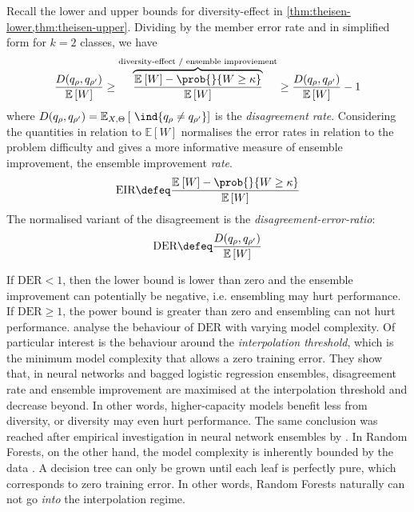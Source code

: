 \documentclass[
	twoside=false, %
]{kaobook}
\begin{document}
Recall the lower and upper bounds for diversity-effect in \cref{thm:theisen-lower,thm:theisen-upper}. 
Dividing by the member error rate and in simplified form for $k=2$ classes, we have
$$
\frac{
D(q_{\rho}, q_{\rho'}) 
}{\mathbb{E}\left[W\right]}
\geq 
\overbrace{
\frac{
\mathbb{E}_{}\left[ W \right]  - \prob{}{W \geq \kappa} 
}{\mathbb{E}\left[W\right]}
}^{\text{diversity-effect / ensemble improviement} }
\geq 
\frac{
D(q_{\rho}, q_{\rho'}) 
}{\mathbb{E}\left[W\right]}
-1
$$ 
where $D(q_{\rho}, q_{\rho'}) = \mathbb{E}_{X, \Theta}\left[ ~\ind{q_{\rho} \not= q_{\rho'}} \right]$ is the \textit{disagreement rate}.
Considering the quantities in relation to $\mathbb{E}\left[W\right]$ normalises the error rates in relation to the problem difficulty and gives a more informative measure of ensemble improvement, the ensemble improvement \textit{rate}.
$$
\text{EIR} \defeq \frac{
\mathbb{E}_{}\left[ W \right]  - \prob{}{W \geq \kappa} 
}{\mathbb{E}\left[W\right]}
$$
The normalised variant of the disagreement is the \textit{disagreement-error-ratio}:
$$
\text{DER} \defeq 
\frac{
D(q_{\rho}, q_{\rho'}) 
}{\mathbb{E}\left[W\right]}
$$

If $\text{DER} < 1$, then the lower bound is lower than zero and the ensemble improvement can potentially be negative, i.e. ensembling may hurt performance. If $\text{DER} \geq 1$, the power bound is greater than zero and ensembling can not hurt performance. \citeauthor{theisen_WhenAreEnsembles_2023} \cite{theisen_WhenAreEnsembles_2023} analyse the behaviour of $\text{DER}$ with varying model complexity. Of particular interest is the behaviour around the \textit{interpolation threshold}, which is the minimum model complexity that allows a zero training error. They show that, in neural networks and bagged logistic regression ensembles, disagreement rate and ensemble improvement are maximised at the interpolation threshold and decrease beyond. In other words, higher-capacity models benefit less from diversity, or diversity may even hurt performance. The same conclusion was reached after empirical investigation in neural network ensembles by \citeauthor{abe_BestDeepEnsembles_2022} \cite{abe_BestDeepEnsembles_2022}.
In Random Forests, on the other hand, the model complexity is inherently bounded by the data \cite{buschjager_ThereNoDoubleDescent_2021,theisen_WhenAreEnsembles_2023}. A decision tree can only be grown until each leaf is perfectly pure, which corresponds to zero training error. In other words, Random Forests naturally can not go \textit{into} the interpolation regime.
\end{document}

